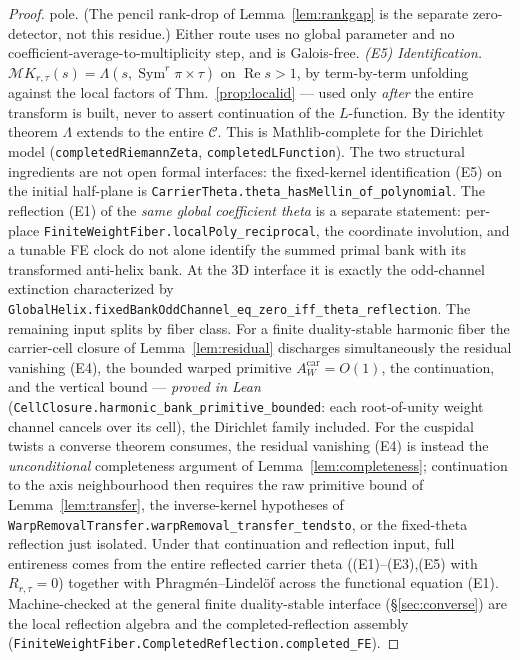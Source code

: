 \documentclass[11pt]{article}
\theoremstyle{definition}
\renewcommand{\Re}{\operatorname{Re}}
\newcommand{\Sym}{\operatorname{Sym}}
\begin{document}
\begin{proof}
pole. (The pencil rank-drop of Lemma~\ref{lem:rankgap} is the separate zero-detector, not this residue.)
Either route uses no global parameter and no coefficient-average-to-multiplicity step, and is Galois-free.
\emph{(E5) Identification.} $\mathcal M K_{r,\tau}(s)=\Lambda(s,\Sym^r\pi\times\tau)$ on $\Re s>1$, by
term-by-term unfolding against the local factors of Thm.~\ref{prop:localid} --- used only \emph{after} the
entire transform is built, never to assert continuation of the $L$-function. By the identity theorem
$\Lambda$ extends to the entire $\mathcal C$. This is Mathlib-complete for the Dirichlet model
(\texttt{completedRiemannZeta}, \texttt{completedLFunction}). The two structural ingredients are not open
formal interfaces: the fixed-kernel identification \textup{(E5)} on the initial half-plane is
\texttt{CarrierTheta.theta\_hasMellin\_of\_polynomial}.  The reflection \textup{(E1)} of the \emph{same
global coefficient theta} is a separate statement: per-place
\texttt{FiniteWeightFiber.localPoly\_reciprocal}, the coordinate involution, and a tunable FE clock do not
alone identify the summed primal bank with its transformed anti-helix bank.  At the 3D interface it is exactly
the odd-channel extinction characterized by
\texttt{GlobalHelix.fixedBankOddChannel\_eq\_zero\_iff\_theta\_reflection}. The remaining input splits by fiber class. For a finite duality-stable
harmonic fiber the carrier-cell closure of Lemma~\ref{lem:residual} discharges simultaneously the residual
vanishing \textup{(E4)}, the bounded warped primitive $A^{\mathrm{car}}_W=O(1)$, the continuation, and the
vertical bound --- \emph{proved in Lean} (\texttt{CellClosure.harmonic\_bank\_primitive\_bounded}: each
root-of-unity weight channel cancels over its cell), the Dirichlet family included. For the cuspidal twists a
converse theorem consumes, the residual vanishing \textup{(E4)} is instead the \emph{unconditional}
completeness argument of Lemma~\ref{lem:completeness}; continuation to the axis neighbourhood then requires
the raw primitive bound of Lemma~\ref{lem:transfer}, the inverse-kernel hypotheses of
\texttt{WarpRemovalTransfer.warpRemoval\_transfer\_tendsto}, or the fixed-theta reflection just
isolated.  Under that continuation and reflection input, full entireness comes from the entire reflected carrier theta
(\textup{(E1)--(E3),(E5)} with $R_{r,\tau}=0$) together with Phragm\'en--Lindel\"of across the functional
equation \textup{(E1)}. Machine-checked at the general finite
duality-stable interface (\S\ref{sec:converse}) are the local reflection algebra and the
completed-reflection assembly (\texttt{FiniteWeightFiber.CompletedReflection.completed\_FE}).
\end{proof}
\end{document}
